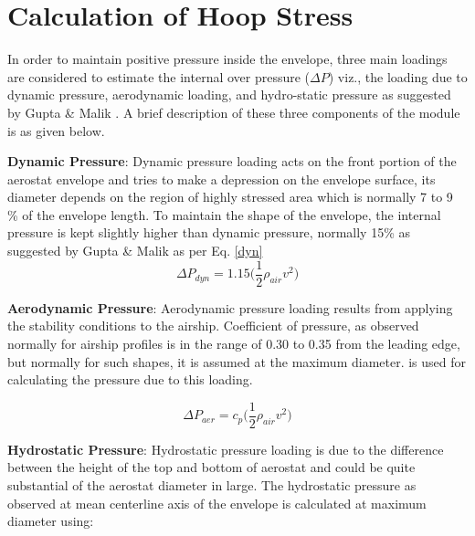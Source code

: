 \chapter{Calculation of Hoop Stress}
\label{Hoop stress}

In order to maintain positive pressure inside the envelope, three main loadings are considered to estimate the internal over pressure ($ \Delta P $) viz., the loading due to dynamic pressure, aerodynamic loading, and hydro-static pressure as suggested by Gupta \& Malik \cite{gupta2002envelope} . A brief description of these three components of the module is as given below.

\textbf{Dynamic Pressure}: Dynamic pressure loading acts on the front portion of the aerostat envelope and tries to make a depression on the envelope surface, its diameter depends on the region of highly stressed area which is normally 7 to 9 \% of the envelope length. To maintain the shape of the envelope, the internal pressure is kept slightly higher than dynamic pressure, normally 15\% as suggested by Gupta \& Malik \cite{gupta2002envelope} as per Eq. \ref{dyn}
\begin{equation}
\label{dyn}
\Delta P_{dyn} = 1.15 \bigg( \frac{1}{2} \rho_{air} v^{2} \bigg)
\end{equation}

\textbf{Aerodynamic Pressure}: Aerodynamic pressure loading results from applying the stability conditions to the airship. Coefficient of pressure, as observed normally for airship profiles is in the range of 0.30 to 0.35 from the leading edge, but normally for such shapes, it is assumed at the maximum diameter. is used for calculating the pressure due to this loading.

\begin{equation}
\label{aer}
\Delta P_{aer} = c_{p} \bigg( \frac{1}{2} \rho_{air} v^{2} \bigg)
\end{equation}

\textbf{Hydrostatic Pressure}: Hydrostatic pressure loading is due to the difference between the height of the top and bottom of aerostat and could be quite substantial of the aerostat diameter in large. The hydrostatic pressure as observed at mean centerline axis of the envelope is calculated at maximum diameter using:

